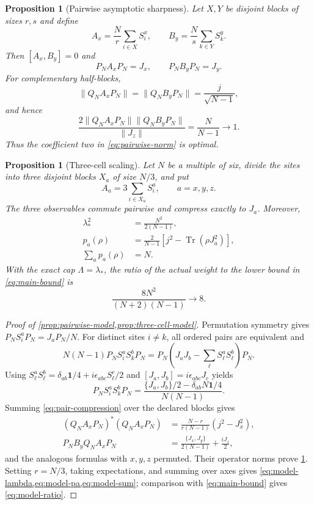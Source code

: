 \documentclass[11pt]{article}
\newtheorem{proposition}[theorem]{Proposition}
\theoremstyle{remark}
\newcommand{\1}{\mathbf 1}
\newcommand{\Tr}{\operatorname{Tr}}
\begin{document}
\begin{proposition}[Pairwise asymptotic sharpness]
\label{prop:pairwise-model}
Let $X,Y$ be disjoint blocks of sizes $r,s$ and define
\[
  A_x=\frac Nr\sum_{i\in X}S_i^x,
  \qquad
  B_y=\frac Ns\sum_{k\in Y}S_k^y.
\]
Then $[A_x,B_y]=0$ and
\[
  P_NA_xP_N=J_x,
  \qquad P_NB_yP_N=J_y.
\]
For complementary half-blocks,
\[
  \lVert Q_N A_xP_N\rVert
  =\lVert Q_N B_yP_N\rVert
  =\frac{j}{\sqrt{N-1}},
\]
and hence
\begin{equation}
  \frac{2\lVert Q_N A_xP_N\rVert\lVert Q_N B_yP_N\rVert}
       {\lVert J_z\rVert}
  =\frac{N}{N-1}\longrightarrow1.
  \label{eq:pairwise-sharp}
\end{equation}
Thus the coefficient two in \cref{eq:pairwise-norm} is optimal.
\end{proposition}

\begin{proposition}[Three-cell scaling]
\label{prop:three-cell-model}
Let $N$ be a multiple of six, divide the sites into three disjoint blocks
$X_a$ of size $N/3$, and put
\[
  A_a=3\sum_{i\in X_a}S_i^a,
  \qquad a=x,y,z.
\]
The three observables commute pairwise and compress exactly to $J_a$. Moreover,
\begin{align}
  \lambda_*^2
  &=\frac{N^2}{2(N-1)},
  \label{eq:model-lambda}\\
  p_a(\rho)
  &=\frac{2}{N-1}\left[j^2-\Tr(\rho J_a^2)\right],
  \label{eq:model-pa}\\
  \sum_a p_a(\rho)&=N.
  \label{eq:model-sum}
\end{align}
With the exact cap $\Lambda=\lambda_*$, the ratio of the actual weight to the
lower bound in \cref{eq:main-bound} is
\begin{equation}
  \frac{8N^2}{(N+2)(N-1)}\longrightarrow8.
  \label{eq:model-ratio}
\end{equation}
\end{proposition}

\begin{proof}[Proof of \cref{prop:pairwise-model,prop:three-cell-model}]
Permutation symmetry gives $P_NS_i^aP_N=J_aP_N/N$. For distinct sites
$i\neq k$, all ordered pairs are equivalent and
\[
  N(N-1)P_NS_i^aS_k^bP_N
  =P_N\left(J_aJ_b-\sum_{\ell}S_\ell^aS_\ell^b\right)P_N.
\]
Using
$S_\ell^aS_\ell^b=\delta_{ab}\1/4+i\epsilon_{abc}S_\ell^c/2$
and $[J_a,J_b]=i\epsilon_{abc}J_c$ yields
\begin{equation}
  P_NS_i^aS_k^bP_N
  =\frac{\{J_a,J_b\}/2-\delta_{ab}N\1/4}{N(N-1)}.
  \label{eq:pair-compression}
\end{equation}
Summing \cref{eq:pair-compression} over the declared blocks gives
\begin{align*}
  (Q_N A_xP_N)^*(Q_N A_xP_N)
  &=\frac{N-r}{r(N-1)}(j^2-J_x^2),\\
  P_NB_yQ_N A_xP_N
  &=\frac{\{J_x,J_y\}}{2(N-1)}+\frac{iJ_z}{2},
\end{align*}
and the analogous formulas with $x,y,z$ permuted. Their operator norms prove
\cref{prop:pairwise-model}. Setting $r=N/3$, taking expectations, and summing
over axes gives \cref{eq:model-lambda,eq:model-pa,eq:model-sum}; comparison
with \cref{eq:main-bound} gives \cref{eq:model-ratio}.
\end{proof}
\end{document}
